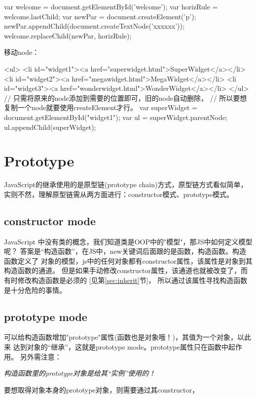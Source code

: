 \documentclass[a4paper,11pt]{article}
\begin{document}
\begin{javascriptcode}
  var welcome = document.getElementById('welcome');
  var horizRule = welcome.lastChild;
  var newPar = document.createElement('p');
  newPar.appendChild(document.createTextNode('xxxxxx'));
  welcome.replaceChild(newPar, horizRule);
\end{javascriptcode}

移动node：

\begin{javascriptcode}
  <ul>
    <li id="widget1"><a href="superwidget.html">SuperWidget</a></li>
    <li id="widget2"><a href="megawidget.html">MegaWidget</a></li>
    <li id="widget3"><a href="wonderwidget.html">WonderWidget</a></li>
  </ul>
  // 只需将原来的node添加到需要的位置即可，旧的node自动删除，
  // 所以要想复制一个node就要使用createElement才行。
  var superWidget = document.getElementById("widget1");
  var ul = superWidget.parentNode;
  ul.appendChild(superWidget);
\end{javascriptcode}


\section[Prototype]{Prototype}
JavaScript的继承使用的是原型链(prototype chain)方式，原型链方式看似简单，
实则不然，理解原型链需从两方面进行：constructor模式、prototype模式。

\subsection[constructor mode]{constructor mode}
JavaScript 中没有类的概念，我们知道类是OOP中的"模型"，那JS中如何定义模型呢？
答案是“构造函数”，在JS中，new关键词后面跟的是函数，构造函数。构造函数定义了
对象的模型，js中的任何对象都有constructor属性，该属性是对象到其构造函数的通道。
但是如果手动修改constructor属性，该通道也就被改变了，而有时修改构造函数是必须的
[见第\ref{sec:inherit}节]，
所以通过该属性寻找构造函数是十分危险的事情。

\subsection[prototype mode]{prototype mode}
可以给构造函数增加"prototype"属性(函数也是对象哦！)，其值为一个对象，以此来
达到对象的“继承”，这就是prototype mode。prototype属性只在函数中起作用。
另外需注意：

\emph{构造函数里的prototype对象是给其“实例”使用的！}

要想取得对象本身的prototype对象，则需要通过其constructor，
\end{document}
